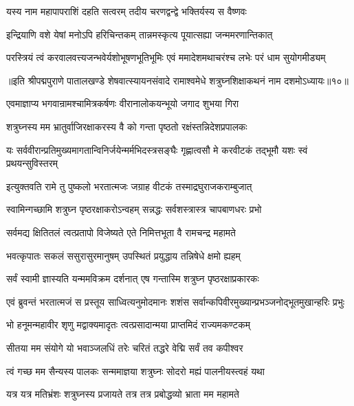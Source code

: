 \twolineshloka
{यस्य नाम महापापराशिं दहति सत्वरम्}
{तदीय चरणद्वन्द्वे भक्तिर्यस्य स वैष्णवः}%

\twolineshloka
{इन्द्रियाणि वशे येषां मनोऽपि हरिचिन्तकम्}
{तान्नमस्कृत्य पूयात्सह्या जन्ममरणान्तिकात्}%

\twolineshloka
{परस्त्रियं त्वं करवालवत्त्यजन्भवेर्यशोभूषणभूतिभूमिः}
{एवं ममादेशमथाचरंश्च लभेः परं धाम सुयोगमीड्यम्}%

॥इति श्रीपद्मपुराणे पातालखण्डे शेषवात्स्यायनसंवादे रामाश्वमेधे शत्रुघ्नशिक्षाकथनं नाम दशमोऽध्यायः॥१०॥



\twolineshloka
{एवमाज्ञाप्य भगवान्रामश्चामित्रकर्षणः}
{वीरानालोकयन्भूयो जगाद शुभया गिरा}%

\twolineshloka
{शत्रुघ्नस्य मम भ्रातुर्वाजिरक्षाकरस्य वै}
{को गन्ता पृष्ठतो रक्षंस्तन्निदेशप्रपालकः}%

\twolineshloka
{यः सर्ववीरान्प्रतिमुख्यमागतान्विनिर्जयेन्मर्मभिदस्त्रसङ्घैः}
{गृह्णात्वसौ मे करवीटकं तद्भूमौ यशः स्वं प्रथयन्सुविस्तरम्}%

\twolineshloka
{इत्युक्तवति रामे तु पुष्कलो भरतात्मजः}
{जग्राह वीटकं तस्माद्रघुराजकराम्बुजात्}%

\twolineshloka
{स्वामिन्गच्छामि शत्रुघ्न पृष्ठरक्षाकरोऽन्वहम्}
{सन्नद्धः सर्वशस्त्रास्त्र चापबाणधरः प्रभो}%

\twolineshloka
{सर्वमद्य क्षितितलं त्वत्प्रतापो विजेष्यते}
{एते निमित्तभूता वै रामचन्द्र महामते}%

\twolineshloka
{भवत्कृपातः सकलं ससुरासुरमानुषम्}
{उपस्थितं प्रयुद्धाय तन्निषेधे क्षमो ह्यहम्}%

\twolineshloka
{सर्वं स्वामी ज्ञास्यति यन्ममविक्रम दर्शनात्}
{एष गन्तास्मि शत्रुघ्न पृष्ठरक्षाप्रकारकः}%

\twolineshloka
{एवं ब्रुवन्तं भरतात्मजं स प्रस्तूय साध्वित्यनुमोदमानः}
{शशंस सर्वान्कपिवीरमुख्यान्प्रभञ्जनोद्भूतमुखान्हरिः प्रभुः}%

\twolineshloka
{भो हनूमन्महावीर शृणु मद्वाक्यमादृतः}
{त्वत्प्रसादान्मया प्राप्तमिदं राज्यमकण्टकम्}%

\twolineshloka
{सीतया मम संयोगे यो भवाञ्जलधिं तरेः}
{चरितं तद्धरे वेद्मि सर्वं तव कपीश्वर}%

\twolineshloka
{त्वं गच्छ मम सैन्यस्य पालकः सन्ममाज्ञया}
{शत्रुघ्नः सोदरो मह्यं पालनीयस्त्वहं यथा}%

\twolineshloka
{यत्र यत्र मतिभ्रंशः शत्रुघ्नस्य प्रजायते}
{तत्र तत्र प्रबोद्धव्यो भ्राता मम महामते}%

